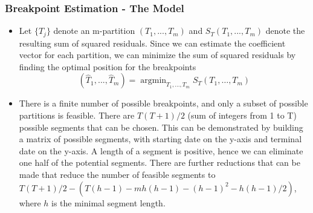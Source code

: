 \documentclass[presentation.tex]{subfiles}
\begin{document}
\begin{frame}
  \frametitle{}

\frametitle{Breakpoint Estimation - The Model}
\begin{itemize}
\item
Let $\{T_j\}$ denote an m-partition $(T_1, ..., T_m)$ and $S_T(T_1, ..., T_m)$
denote the resulting sum of squared residuals. Since we can estimate the
coefficient vector for each partition, we can minimize the sum of
squared residuals by finding the optimal position for the breakpoints
\[
(\hat{T}_1, ..., \hat{T}_m) = \operatorname{argmin}_{T_{1}, \ldots, T_{m}}
S_{T}\left(T_{1}, \ldots, T_{m}\right)
\]
\item
There is a finite number of possible breakpoints, and only a subset of
possible partitions is feasible. There are $T(T+1)/2$ (sum of integers from 1 to T)
possible segments that can be chosen. This can be demonstrated by building a
matrix of possible segments, with starting date on the y-axis and terminal date
on the y-axis. A length of a segment is positive, hence we can eliminate
one half of the potential segments. There are further reductions
that can be made that reduce the number of feasible segments to
$T(T+1)/2 - \left(T(h-1)-m h(h-1)-(h-1)^{2}-h(h-1) / 2\right)$, where $h$ is the minimal
segment length.
\end{itemize}
\end{frame}
\end{document}
